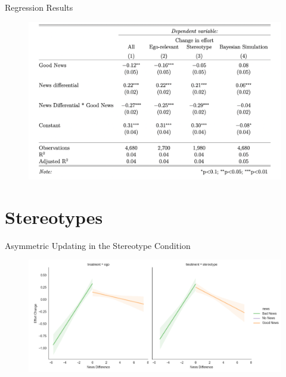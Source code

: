 \documentclass[aspectratio=169]{beamer}
\begin{document}
\begin{frame}{Regression Results}
    \begin{figure}
        \centering
        \includegraphics[scale=.3]{regression_table.png}
    \end{figure}  
\end{frame}

\section*{Stereotypes}

\begin{frame}{Asymmetric Updating in the Stereotype Condition}

    \begin{figure}
        \centering
        \includegraphics[scale=.4]{effort_change_news_treatment.png}
    \end{figure}
    
\end{frame}
\end{document}
